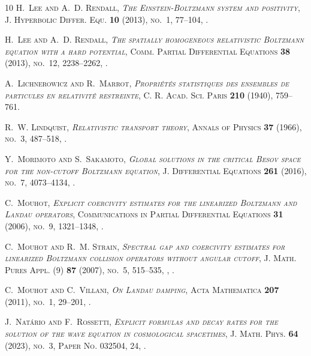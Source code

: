 \documentclass[reqno]{amsart}
\theoremstyle{definition}
\numberwithin{equation}{section}
\numberwithin{theorem}{section}
\begin{document}
\begin{thebibliography}{10}
\bgroup\scshape{}H.~Lee\egroup{} and \bgroup\scshape{}A.~D. Rendall\egroup{}, \emph{The {E}instein-{B}oltzmann system and positivity}, J. Hyperbolic Differ. Equ. \textbf{10} (2013), no.~1, 77--104, .

\bgroup\scshape{}H.~Lee\egroup{} and \bgroup\scshape{}A.~D. Rendall\egroup{}, \emph{The spatially homogeneous relativistic {B}oltzmann equation with a hard potential}, Comm. Partial Differential Equations \textbf{38} (2013), no.~12, 2238--2262, .

\bgroup\scshape{}A.~Lichnerowicz\egroup{} and \bgroup\scshape{}R.~Marrot\egroup{}, \emph{Propri\'et\'es statistiques des ensembles de particules en relativit\'e restreinte}, C. R. Acad. Sci. Paris \textbf{210} (1940), 759--761.

\bgroup\scshape{}R.~W. Lindquist\egroup{}, \emph{Relativistic transport theory}, Annals of Physics \textbf{37} (1966), no.~3, 487--518, .

\bgroup\scshape{}Y.~Morimoto\egroup{} and \bgroup\scshape{}S.~Sakamoto\egroup{}, \emph{Global solutions in the critical {B}esov space for the non-cutoff {B}oltzmann equation}, J. Differential Equations \textbf{261} (2016), no.~7, 4073--4134, .

\bgroup\scshape{}C.~Mouhot\egroup{}, \emph{Explicit coercivity estimates for the linearized {B}oltzmann and {L}andau operators}, Communications in Partial Differential Equations \textbf{31} (2006), no.~9, 1321--1348, .

\bgroup\scshape{}C.~Mouhot\egroup{} and \bgroup\scshape{}R.~M. Strain\egroup{}, \emph{Spectral gap and coercivity estimates for linearized {B}oltzmann collision operators without angular cutoff}, J. Math. Pures Appl. (9) \textbf{87} (2007), no.~5, 515--535, , .

\bgroup\scshape{}C.~Mouhot\egroup{} and \bgroup\scshape{}C.~Villani\egroup{}, \emph{On {L}andau damping}, Acta Mathematica \textbf{207} (2011), no.~1, 29--201, .

\bgroup\scshape{}J.~Nat\'ario\egroup{} and \bgroup\scshape{}F.~Rossetti\egroup{}, \emph{Explicit formulas and decay rates for the solution of the wave equation in cosmological spacetimes}, J. Math. Phys. \textbf{64} (2023), no.~3, Paper No. 032504, 24, .


\end{thebibliography}
\end{document}
